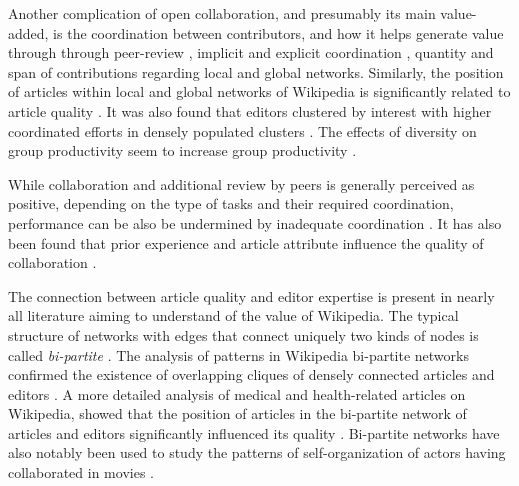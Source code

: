 Another complication of open collaboration, and presumably its main value-added, is the coordination between contributors, and how it helps generate value through through peer-review \cite{hu2007articlequality,wilkinson2007}, implicit and explicit coordination \cite{kittur2008}, quantity and span of contributions regarding local and global networks\cite{arazy2010determinants}. Similarly, the position of articles within local and global networks of Wikipedia is significantly related to article quality \cite{kane2009}. It was also found that editors clustered by interest with higher coordinated efforts in densely populated clusters \cite{jesus2009}.  The effects of diversity on group productivity seem to increase group productivity \cite{chen2010}.

While collaboration and additional review by peers is generally perceived as positive, depending on the type of tasks and their required coordination, performance can be also be undermined by inadequate coordination \cite{kittur2009coordination}.  It has also been found that prior experience and article attribute influence the quality of collaboration \cite{keegan2012}. 



The connection between article quality and editor expertise is present in nearly all literature aiming to understand of the value of Wikipedia. The typical structure of networks with edges that connect uniquely two kinds of nodes is called {\it bi-partite} \cite{newman2001}. The analysis of patterns in Wikipedia bi-partite networks confirmed the existence of overlapping cliques of densely connected articles and editors  \cite{jesus2009}. A more detailed analysis of medical and health-related articles on Wikipedia, showed that the position of articles in the bi-partite network of articles and editors significantly influenced its quality \cite{kane2009}. Bi-partite networks have also notably been used to study the patterns of self-organization of actors having collaborated in movies \cite{ramasco2004self}.

